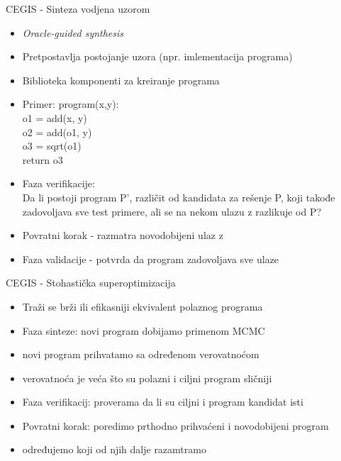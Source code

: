 
\begin{frame}{CEGIS - Sinteza vodjena uzorom}
    \begin{itemize}
        \item \emph{Oracle-guided synthesis}
        \item Pretpostavlja postojanje uzora (npr. imlementacija programa)
        \item Biblioteka komponenti za kreiranje programa
		\item Primer:      
				program(x,y):\\
				o1 = add(x, y)\\
				o2 = add(o1, y)\\
				o3 = sqrt(o1)\\
				return o3\\

        \item Faza verifikacije:\\Da li postoji program P', različit od kandidata za rešenje P, koji takođe zadovoljava sve test primere, ali se na nekom ulazu z razlikuje od P?
        \item Povratni korak - razmatra novodobijeni ulaz z
        \item Faza validacije - potvrda da program zadovoljava sve ulaze
    \end{itemize}
\end{frame}

\begin{frame}{CEGIS - Stohastička superoptimizacija}
    \begin{itemize}
        \item Traži se brži ili efikasniji ekvivalent polaznog programa
        \item Faza sinteze: novi program dobijamo primenom MCMC
        \item novi program prihvatamo sa određenom verovatnoćom
        \item verovatnoća je veća što su polazni i ciljni program sličniji
        \item Faza verifikacij: proverama da li su ciljni i program kandidat isti
        \item Povratni korak: poredimo prthodno prihvaćeni i novodobijeni program
        \item određujemo koji od njih dalje razamtramo
    \end{itemize}
\end{frame}

